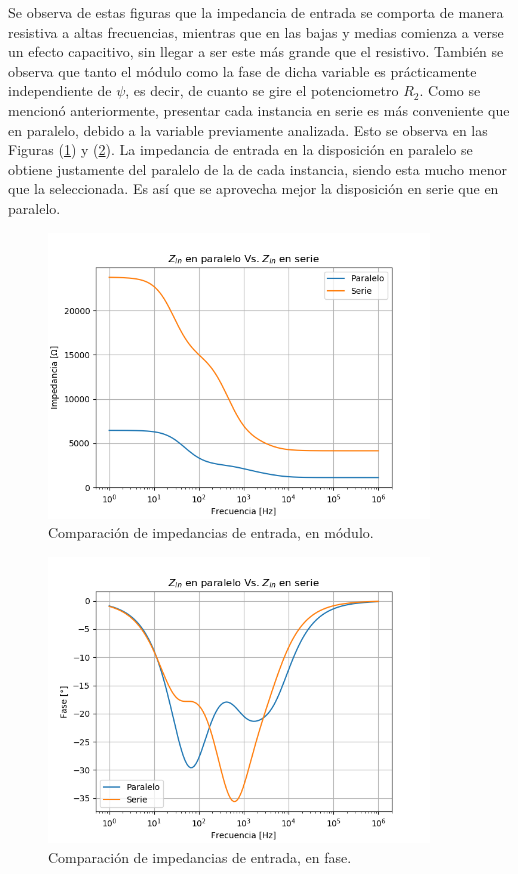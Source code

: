 \documentclass[a4paper]{article}
\begin{document}
Se observa de estas figuras que la impedancia de entrada se comporta de manera resistiva a altas frecuencias, mientras que en las bajas y medias comienza a verse un efecto capacitivo, sin llegar a ser este más grande que el resistivo. También se observa que tanto el módulo como la fase de dicha variable es prácticamente independiente de $\psi$, es decir, de cuanto se gire el potenciometro $R_2$. Como se mencionó anteriormente, presentar cada instancia en serie es más conveniente que en paralelo, debido a la variable previamente analizada. Esto se observa en las Figuras (\ref{fig:zin_comp_mod}) y (\ref{fig:zin_comp_ph}). La impedancia de entrada en la disposición en paralelo se obtiene justamente del paralelo de la de cada instancia, siendo esta mucho menor que la seleccionada. Es así que se aprovecha mejor la disposición en serie que en paralelo. 
\begin{figure}[H]
\centering
	\includegraphics[width=0.9\textwidth, trim = {0 0 0 1.35cm}, clip]{Imagenes/Z-Paralelo-Vs-Serie-Mod.png}
	\caption{Comparación de impedancias de entrada, en módulo.}
	\label{fig:zin_comp_mod}
\end{figure}
\begin{figure}[H]
\centering
		\includegraphics[width=0.9\textwidth, trim = {0 0 0 1.35cm}, clip]{Imagenes/Z-Paralelo-Vs-Serie-Ph.png}
	\caption{Comparación de impedancias de entrada, en fase.}
	\label{fig:zin_comp_ph}
\end{figure}
\end{document}
